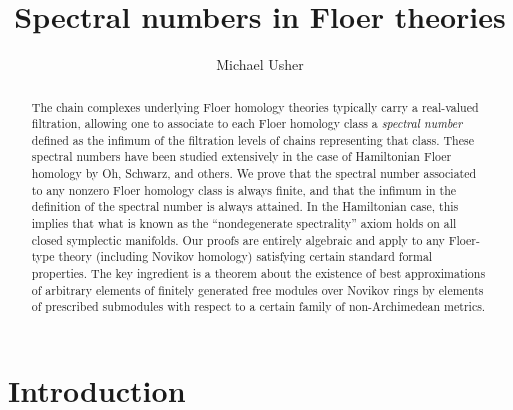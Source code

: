 \documentclass{amsart}
\theoremstyle{plain}
\theoremstyle{definition}
\theoremstyle{remark}
\begin{document}
\title{Spectral numbers in Floer theories}\author{Michael Usher}\address{Princeton University\\Fine Hall\\Washington Road\\Princeton, NJ 08544} 
\begin{abstract}
The chain complexes underlying Floer homology theories typically carry a real-valued filtration, allowing one to associate to each Floer homology class a \emph{spectral number} defined as the infimum of the filtration levels of chains representing that class.  These spectral numbers have been studied extensively in the case of Hamiltonian Floer homology by Oh, Schwarz, and others.  We prove that the spectral number associated to any nonzero Floer homology class is always finite, and that the infimum in the definition of the spectral number is always attained.  In the Hamiltonian case, this implies that what is known as the ``nondegenerate spectrality'' axiom holds on all closed symplectic manifolds.  Our proofs are entirely algebraic  and apply to any Floer-type theory (including Novikov homology) satisfying certain standard formal properties.   The key ingredient is a theorem about the existence of best approximations of arbitrary elements of finitely generated free modules over Novikov rings by elements of prescribed submodules with respect to a certain family of non-Archimedean metrics. 
\end{abstract}
\maketitle
\section{Introduction}
\end{document}
